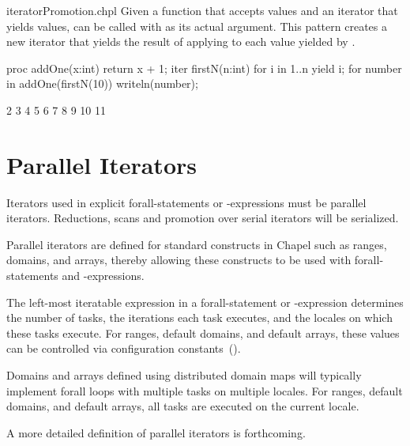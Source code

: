 \begin{chapelexample}{iteratorPromotion.chpl}
Given a function  that accepts  values
and an iterator  that yields  values,
 can be called with  as its actual argument.
This pattern creates a new iterator that yields the result of applying
 to each value yielded by .

\begin{chapel}
proc addOne(x:int) {
  return x + 1;
}
iter firstN(n:int) {
  for i in 1..n {
    yield i;
  }
}
for number in addOne(firstN(10)) {
  writeln(number);
}
\end{chapel}
\begin{chapeloutput}
2
3
4
5
6
7
8
9
10
11
\end{chapeloutput}

\end{chapelexample}

\section{Parallel Iterators}
\label{Parallel_Iterators}

Iterators used in explicit forall-statements or -expressions must be
parallel iterators.  Reductions, scans and promotion over serial
iterators will be serialized.

Parallel iterators are defined for standard constructs in Chapel such
as ranges, domains, and arrays, thereby allowing these constructs to
be used with forall-statements and -expressions.

The left-most iteratable expression in a forall-statement or
-expression determines the number of tasks, the iterations each task
executes, and the locales on which these tasks execute.  For ranges,
default domains, and default arrays, these values can be controlled
via configuration constants~().

Domains and arrays defined using distributed domain maps will
typically implement forall loops with multiple tasks on multiple
locales.  For ranges, default domains, and default arrays, all tasks
are executed on the current locale.

A more detailed definition of parallel iterators is forthcoming.
